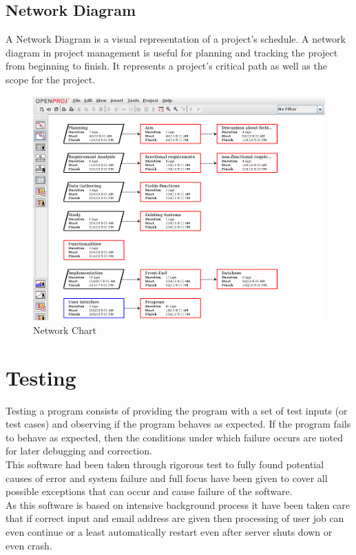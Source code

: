 \subsection{Network Diagram}
A Network Diagram is a visual representation of a project's schedule. A network diagram in project management is useful for planning and tracking the project from beginning to finish. It represents a project's critical path as well as the scope for the project.

 \begin{figure}[!h]
	\centering \includegraphics[scale=.43]{input/images/networkchart.png}
	\caption{Network Chart}
\end{figure}
\section{Testing}
Testing a program consists of providing the program with a set of test inputs (or test cases) and
observing if the program behaves as expected. If the program fails to behave as expected, then the
conditions under which failure occurs are noted for later debugging and correction. \\
This software had been taken through rigorous test to fully found potential causes of error and system failure
and full focus have been given to cover all possible exceptions that can 
occur and cause failure of the software.\\
As this software is based on intensive background process it have been taken care that 
if correct input and email address are given then processing of user job can even continue or a least automatically 
restart even after server shuts down or even crash.\\\\


